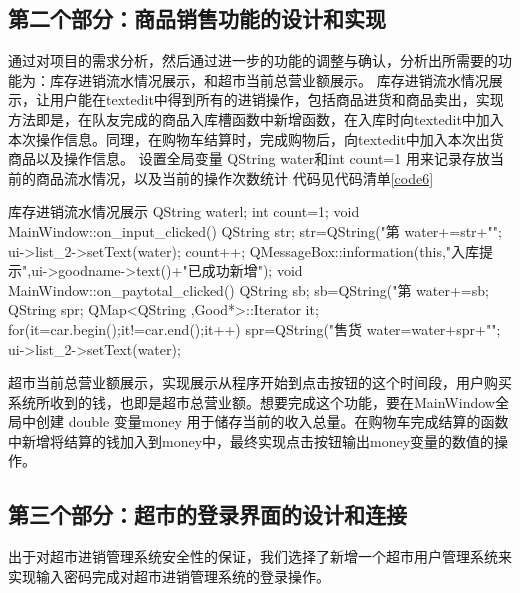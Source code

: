 \documentclass[
   projtype=report, %
   output=print,     %
  ]{nwafuprojrep}
\begin{document}
\subsection{第二个部分：商品销售功能的设计和实现}
通过对项目的需求分析，然后通过进一步的功能的调整与确认，分析出所需要的功能为：库存进销流水情况展示，和超市当前总营业额展示。
库存进销流水情况展示，让用户能在textedit中得到所有的进销操作，包括商品进货和商品卖出，实现方法即是，在队友完成的商品入库槽函数中新增函数，在入库时向textedit中加入本次操作信息。同理，在购物车结算时，完成购物后，向textedit中加入本次出货商品以及操作信息。
设置全局变量 QString water和int count=1 用来记录存放当前的商品流水情况，以及当前的操作次数统计
代码见代码清单\ref{code6}
\begin{langCVOne}[C++][code6][QT]{库存进销流水情况展示}
QString waterl;
int count=1;
void MainWindow::on_input_clicked()
{
    QString str;
    str=QString("第%
    water+=str+"\n";
    ui->list_2->setText(water);
    count++;
    QMessageBox::information(this,"入库提示",ui->goodname->text()+"已成功新增");
}
void MainWindow::on_paytotal_clicked()
{
    QString sb;
    sb=QString("第%
    water+=sb;
    QString spr;
    QMap<QString ,Good*>::Iterator it;
    for(it=car.begin();it!=car.end();it++)
    {
        spr=QString("售货%
        water=water+spr+"\n";
    }
    ui->list_2->setText(water);
}
\end{langCVOne}
超市当前总营业额展示，实现展示从程序开始到点击按钮的这个时间段，用户购买系统所收到的钱，也即是超市总营业额。想要完成这个功能，要在MainWindow全局中创建 double 变量money 用于储存当前的收入总量。在购物车完成结算的函数中新增将结算的钱加入到money中，最终实现点击按钮输出money变量的数值的操作。
\subsection{第三个部分：超市的登录界面的设计和连接}
出于对超市进销管理系统安全性的保证，我们选择了新增一个超市用户管理系统来实现输入密码完成对超市进销管理系统的登录操作。
\end{document}

